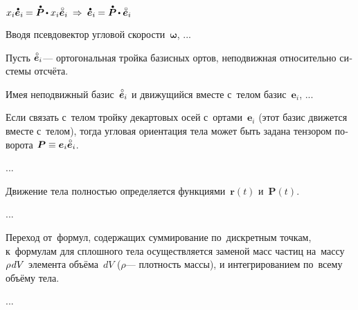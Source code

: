 ${x_i \mathdotabove{\bm{e}}_i \hspace{-0.12ex} = \mathdotabove{\bm{P}} \hspace{-0.16ex} \dotp x_i \mathcircabove{\bm{e}}_i
\:\Rightarrow\:
\mathdotabove{\bm{e}}_i \hspace{-0.12ex} = \mathdotabove{\bm{P}} \hspace{-0.16ex} \dotp \mathcircabove{\bm{e}}_i}$



\foreignlanguage{russian}{Вводя псевдовектор угловой скорости~$\bm{\omega}$, ...}




\foreignlanguage{russian}{Пусть ${\mathcircabove{\bm{e}}_i}$\:--- ортогональная тройка базисных ортов, неподвижная относительно системы отсчёта.}

\foreignlanguage{russian}{Имея неподвижный базис~${\mathcircabove{\bm{e}}_i}$ и движущийся вместе с~телом базис~${\bm{e}_i}$, ...}

\foreignlanguage{russian}{Если связать с~телом тройку декартовых осей с~ортами~${\bm{e}_i}$ (этот базис движется вместе с~телом), тогда угловая ориентация тела может быть задана тензором поворота ${\bm{P} \equiv \bm{e}_i \mathcircabove{\bm{e}}_i}$.}

...

\foreignlanguage{russian}{Движение тела полностью определяется функциями~${\bm{r}(t)}$ и~${\bm{P}(t)}$.}

...

\foreignlanguage{russian}{Переход от~формул, содержащих суммирование по~дискретным точкам, к~формулам для сплошного тела осуществляется заменой масс частиц на~массу ${\rho \hspace{0.2ex} dV}$ элемента объёма~$dV$ ($\rho$\:--- плотность массы), и интегрированием по~всему объёму тела.}

...


